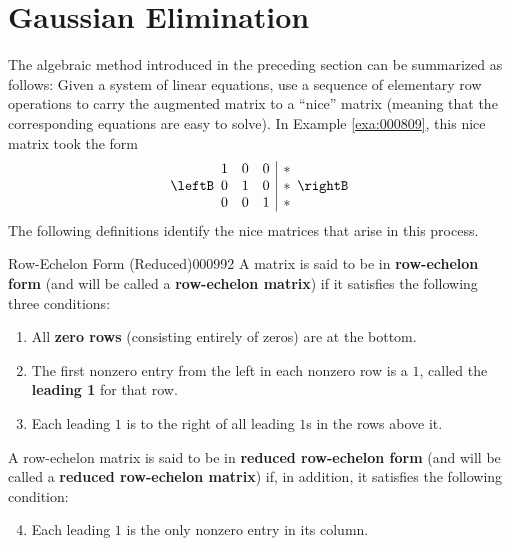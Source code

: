 \section{Gaussian Elimination}
\label{sec:1_2}

The algebraic method introduced in the preceding section can be summarized as follows: Given a system of linear equations, use a sequence of elementary row operations to carry the augmented matrix to a ``nice'' matrix (meaning that the corresponding equations are easy to solve). In Example \ref{exa:000809}, this nice matrix took the form
\begin{equation*}
\leftB \begin{array}{rrr|r}
	1 & 0 & 0 & * \\
	0 & 1 & 0 & * \\
	0 & 0 & 1 & *
\end{array} \rightB
\end{equation*}
The following definitions identify the nice matrices that arise in this process.


\begin{definition}{Row-Echelon Form (Reduced)}{000992}
A matrix is said to be in \textbf{row-echelon form} (and will be called a \textbf{row-echelon matrix}) if it satisfies the following three conditions:

\begin{enumerate}
\item All \textbf{zero rows} (consisting entirely of zeros) are at the bottom.

\item The first nonzero entry from the left in each nonzero row is a $1$, called the \textbf{leading 1} for that row.

\item Each leading $1$ is to the right of all leading $1$s in the rows above it.

\end{enumerate}

A row-echelon matrix is said to be in \textbf{reduced row-echelon form} (and will be called a \textbf{reduced row-echelon matrix}) if, in addition, it satisfies the following condition:

\begin{enumerate}
\setcounter{enumi}{3}
\item Each leading $1$ is the only nonzero entry in its column.

\end{enumerate}
\end{definition}

